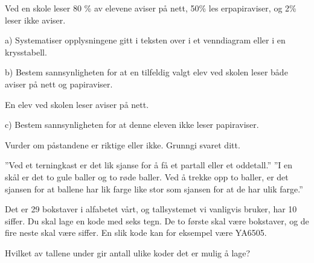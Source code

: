 Ved en skole leser 80 \% av elevene aviser på nett, 50\% les erpapiraviser, og 2\% leser ikke
aviser. \os

a) Systematiser opplysningene gitt i teksten over i et venndiagram eller i en
krysstabell. \os

b) Bestem sannsynligheten for at en tilfeldig valgt elev ved skolen leser både aviser på nett og papiraviser.\os

En elev ved skolen leser aviser på nett.\os

c) Bestem sannsynligheten for at denne eleven ikke leser papiraviser.


Vurder om påstandene er riktige eller ikke. Grunngi svaret ditt.\os

''Ved et terningkast er det lik sjanse for å få et partall eller et oddetall.'' \os
''I en skål er det to gule baller og to røde baller. Ved å trekke opp to baller, er det sjansen for at ballene har lik farge like stor som sjansen for at de har ulik farge.''

Det er 29 bokstaver i alfabetet vårt, og tallsystemet vi vanligvis bruker, har 10 siffer.
Du skal lage en kode med seks tegn. De to første skal være bokstaver, og de fire neste skal være
siffer. En slik kode kan for eksempel være YA6505. \os

Hvilket av tallene under gir antall ulike koder det er mulig å lage? \os
{}



